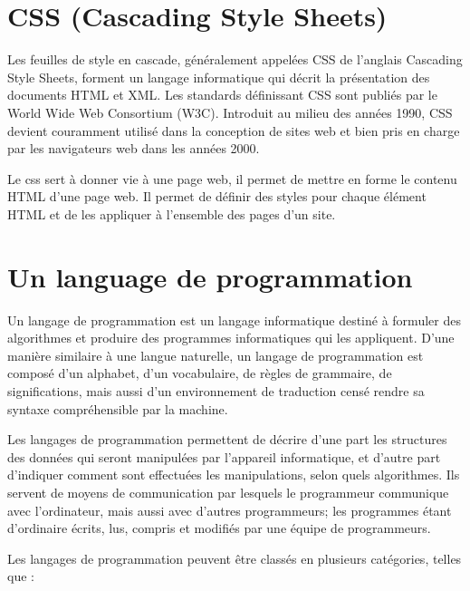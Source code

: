 \section{CSS (Cascading Style Sheets)}\label{sec:css}
Les feuilles de style en cascade\cite{css}, généralement appelées CSS de l'anglais Cascading Style Sheets,
forment un langage informatique qui décrit la présentation des documents HTML et XML.
Les standards définissant CSS sont publiés par le World Wide Web Consortium (W3C).
Introduit au milieu des années 1990, CSS devient couramment utilisé dans la conception
de sites web et bien pris en charge par les navigateurs web dans les années 2000.

Le css sert à donner vie à une page web, il permet de mettre en forme le contenu HTML
d'une page web. Il permet de définir des styles pour chaque élément HTML et de les
appliquer à l'ensemble des pages d'un site.

\section{Un language de programmation}\label{sec:language-de-programmation}
Un langage de programmation\cite{langage_programmation} est un langage informatique destiné à formuler des algorithmes et
produire des programmes informatiques qui les appliquent. D'une manière similaire à une langue
naturelle, un langage de programmation est composé d'un alphabet, d'un vocabulaire, de règles
de grammaire, de significations, mais aussi d'un environnement de traduction censé rendre
sa syntaxe compréhensible par la machine.

Les langages de programmation permettent de décrire d'une part les structures des données
qui seront manipulées par l'appareil informatique, et d'autre part d'indiquer comment sont
effectuées les manipulations, selon quels algorithmes. Ils servent de moyens de communication
par lesquels le programmeur communique avec l'ordinateur, mais aussi avec d'autres programmeurs;
les programmes étant d'ordinaire écrits, lus, compris et modifiés par une équipe de programmeurs.


Les langages de programmation peuvent être classés en plusieurs catégories, telles que :


